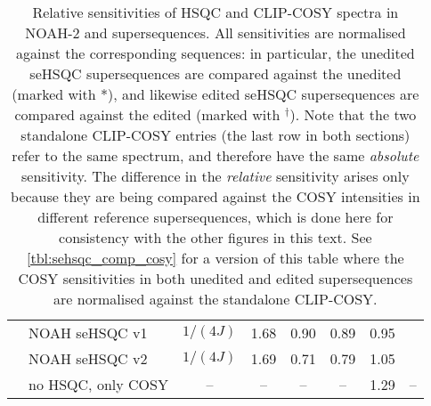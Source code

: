 {\begin{table}
\begin{tabular}{clcccccc}
         & NOAH seHSQC v1      & $1/(4J)$       & 1.68 & 0.90 & 0.89 & 0.95 & {fig:1_4j_edited_spv1} \\
         & NOAH seHSQC v2      & $1/(4J)$       & 1.69 & 0.71 & 0.79 & 1.05 & {fig:1_4j_edited_spv2} \\
         & no HSQC, only COSY  & --             & --   & --   & --   & 1.29 & -- \\ 
        \bottomrule
    \end{tabular}
    \caption{
        Relative sensitivities of HSQC and CLIP-COSY spectra in NOAH-2  and  supersequences.
        All sensitivities are normalised against the corresponding  sequences: in particular, the unedited seHSQC supersequences are compared against the unedited  (marked with *), and likewise edited seHSQC supersequences are compared against the edited  (marked with $^\dagger$).
        Note that the two standalone CLIP-COSY entries (the last row in both sections) refer to the same spectrum, and therefore have the same \textit{absolute} sensitivity.
        The difference in the \textit{relative} sensitivity arises only because they are being compared against the COSY intensities in different reference supersequences, which is done here for consistency with the other figures in this text.
        See \cref{tbl:sehsqc_comp_cosy} for a version of this table where the COSY sensitivities in both unedited and edited supersequences are normalised against the standalone CLIP-COSY.
        \andro{}
    }
    \label{tbl:sehsqc_comp}
\end{table}
} %

